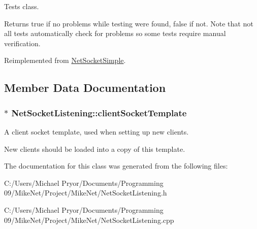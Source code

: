 Tests class. 

\begin{DoxyReturn}{Returns}
true if no problems while testing were found, false if not. Note that not all tests automatically check for problems so some tests require manual verification. 
\end{DoxyReturn}


Reimplemented from \hyperlink{class_net_socket_simple_a69c2149f61ab6af018faf89e61ec6592}{NetSocketSimple}.



\subsection{Member Data Documentation}
\hypertarget{class_net_socket_listening_a7356aeb773bfca9a4997ac6bc120c348}{
\subsubsection[{clientSocketTemplate}]{$\ast$ {\bf NetSocketListening::clientSocketTemplate}}}
\label{class_net_socket_listening_a7356aeb773bfca9a4997ac6bc120c348}


A client socket template, used when setting up new clients. 

New clients should be loaded into a copy of this template. 

The documentation for this class was generated from the following files:\begin{DoxyCompactItemize}
\item 
C:/Users/Michael Pryor/Documents/Programming 09/MikeNet/Project/MikeNet/NetSocketListening.h\item 
C:/Users/Michael Pryor/Documents/Programming 09/MikeNet/Project/MikeNet/NetSocketListening.cpp\end{DoxyCompactItemize}
